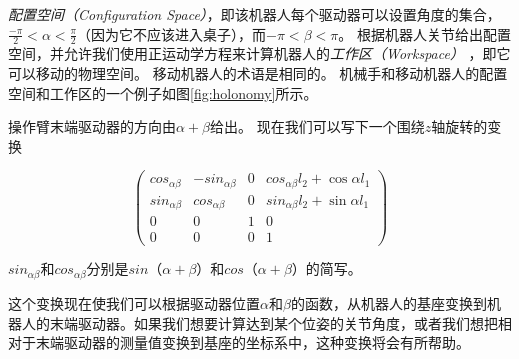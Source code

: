 \emph{配置空间（Configuration Space）}，即该机器人每个驱动器可以设置角度的集合，$\frac{-\pi}{2} <\alpha <\frac{\pi}{2}$（因为它不应该进入桌子），而$-\pi <\beta <\pi$。 根据机器人关节给出配置空间，并允许我们使用正运动学方程来计算机器人的\emph{工作区（Workspace）} ，即它可以移动的物理空间。 移动机器人的术语是相同的。 机械手和移动机器人的配置空间和工作区的一个例子如图\ref{fig:holonomy}所示。


操作臂末端驱动器的方向由$\alpha+\beta$给出。 现在我们可以写下一个围绕$z$轴旋转的变换

\begin{equation}
\label{eq:2armtrans}
\left(\begin{array}{llll}cos_{\alpha\beta} & -sin_{\alpha\beta} &  0 & cos_{\alpha\beta}l_2+\cos\alpha l_1\\
                        sin_{\alpha\beta} & cos_{\alpha\beta} & 0 & sin_{\alpha\beta}l_2+\sin\alpha l_1\\
												0 & 0 & 1 & 0\\
												0 & 0 & 0 & 1\end{array}\right)
\end{equation}


$sin_{\alpha \beta}$和$cos_{\alpha \beta}$分别是$sin（\alpha+\beta）$和$cos（\alpha+\beta）$的简写。


这个变换现在使我们可以根据驱动器位置$\alpha$和$\beta$的函数，从机器人的基座变换到机器人的末端驱动器。如果我们想要计算达到某个位姿的关节角度，或者我们想把相对于末端驱动器的测量值变换到基座的坐标系中，这种变换将会有所帮助。

